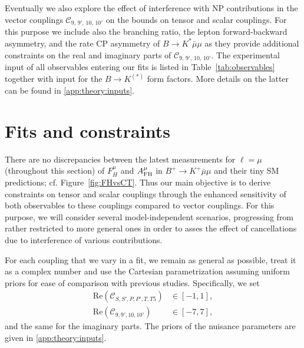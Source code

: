 \documentclass[twocolumn,epjc3]{svjour3}
\numberwithin{equation}{section}
\def \refapp#1{\ref{#1}}
\def \reffig#1{Figure~\ref{#1}}
\def \reftab#1{Table~\ref{#1}}
\def \nn{\nonumber\\}
\newcommand{\checked}[1]{{\color{brown}{ {\bf Checked: }{#1}}}}
\renewcommand{\checked}[1]{#1}
\newcommand{\wilson}[2][{}]{\mathcal{C}_{#2}^{\mathrm{#1}}}
\renewcommand{\[}{\big[}
\renewcommand{\]}{\big]}
\renewcommand{\(}{\big(}
\renewcommand{\)}{\big)}
\begin{document}
Eventually we also explore the effect of interference with {NP contributions}
in the vector couplings $\wilson{9,\,9',\,10,\,10'}$ on the bounds
on tensor and scalar couplings.  For this purpose we include also the branching
ratio, the lepton forward-backward asymmetry, and the rate CP asymmetry of
$B\to K^* \bar\mu\mu$ as they provide additional constraints on the real and
imaginary parts of $\wilson{9,\,9',\,10,\,10'}$. The experimental {input} of all
observables entering our fits is listed in \reftab{tab:observables} together with input for
the $B\to K^{(*)}$ form factors. More details on the latter can be found in
\refapp{app:theory:inputs}.

%
%
%
\section{
  \checked{Fits and constraints}
  \label{sec:results}
}

There are no discrepancies between the latest measurements for $\ell = \mu$
(throughout this section) of $F_H^\mu$ and $A_{\rm FB}^\mu$ in $B^+ \to K^+
\bar\mu\mu$ and their tiny SM predictions; cf. \reffig{fig:FHvsCT}. Thus our
main objective is to derive constraints on tensor and scalar couplings through
the enhanced sensitivity of both observables to {these} couplings compared to
vector couplings. For this purpose, we will consider several model-independent
scenarios, progressing from rather restricted to more general ones in order to
asses the effect of cancellations due to interference of various contributions.

For each coupling {that} we vary in a fit, we remain as general as possible, treat it
as a complex number and use the Cartesian parametrization assuming uniform
priors for ease of comparison with previous studies. Specifically, we set
\begin{align}
  \label{eq:wilson-prior}
  \mbox{Re}(\wilson{S,S',P,P',T,T5}) &\in [-1, 1],\nn \mbox{Re}(\wilson{9,9',10,10'}) &\in [-7, 7],
\end{align}
and the same for the imaginary parts. The priors of the nuisance parameters are given in \refapp{app:theory:inputs}.
\end{document}

